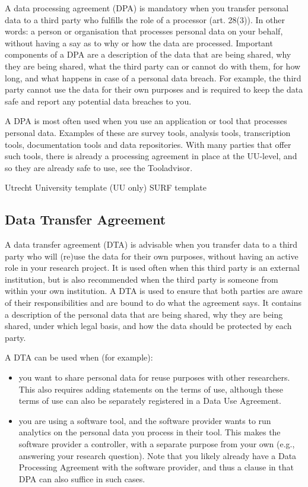 \documentclass[
]{book}
\providecommand{\tightlist}{%
  \setlength{\itemsep}{0pt}\setlength{\parskip}{0pt}}
\begin{document}
A data processing agreement (DPA) is mandatory when you transfer personal data
to a third party who fulfills the role of a processor
(art. 28(3)).
In other words: a person or organisation that processes personal data on your
behalf, without having a say as to why or how the data are processed. Important
components of a DPA are a description of the data that are being shared, why
they are being shared, what the third party can or cannot do with them, for how
long, and what happens in case of a personal data breach. For example, the third
party cannot use the data for their own purposes and is required to keep the
data safe and report any potential data breaches to you.

A DPA is most often used when you use an application or tool that processes
personal data. Examples of these are survey tools, analysis tools, transcription
tools, documentation tools and data repositories. With many parties that offer
such tools, there is already a processing agreement in place at the UU-level,
and so they are already safe to use, see the
Tooladvisor.

Utrecht University template (UU only)
SURF template

\hypertarget{data-transfer-agreement}{%
\subsection{Data Transfer Agreement}\label{data-transfer-agreement}}

A data transfer agreement (DTA) is advisable when you transfer data to a third
party who will (re)use the data for their own purposes, without having an
active role in your research project. It is used often when this third party is
an external institution, but is also recommended when the third party is someone
from within your own institution. A DTA is used to ensure that both parties are
aware of their responsibilities and are bound to do what the agreement says. It
contains a description of the personal data that are being shared, why they are
being shared, under which legal basis, and how the data should be protected by
each party.

A DTA can be used when (for example):

\begin{itemize}
\tightlist
\item
  you want to share personal data for reuse purposes with other researchers.
  This also requires adding statements on the terms of use, although these terms
  of use can also be separately registered in a
  Data Use Agreement.
\item
  you are using a software tool, and the software provider wants to run
  analytics on the personal data you process in their tool. This makes the
  software provider a controller, with a separate purpose from your own (e.g.,
  answering your research question). Note that you likely already have a
  Data Processing Agreement with the
  software provider, and thus a clause in that DPA can also suffice in such cases.
\end{itemize}
\end{document}
